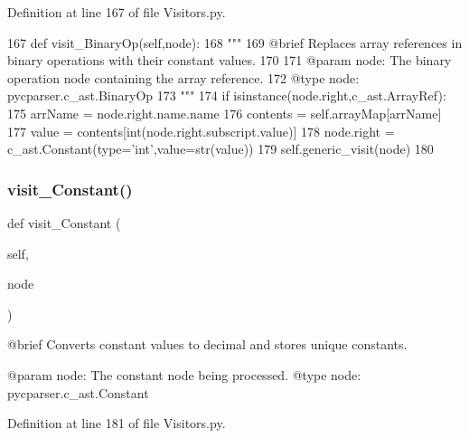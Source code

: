 Definition at line 167 of file Visitors.\+py.


\begin{DoxyCode}
167     \textcolor{keyword}{def }visit\_BinaryOp(self,node):
168         \textcolor{stringliteral}{"""
}
169 \textcolor{stringliteral}{        @brief Replaces array references in binary operations with their constant values.
}
170 \textcolor{stringliteral}{
}
171 \textcolor{stringliteral}{        @param node: The binary operation node containing the array reference.
}
172 \textcolor{stringliteral}{        @type node: pycparser.c\_ast.BinaryOp
}
173 \textcolor{stringliteral}{        """}
174         \textcolor{keywordflow}{if} isinstance(node.right,c\_ast.ArrayRef):
175             arrName = node.right.name.name
176             contents = self.arrayMap[arrName]
177             value = contents[int(node.right.subscript.value)]
178             node.right = c\_ast.Constant(type=\textcolor{stringliteral}{'int'},value=str(value))
179         self.generic\_visit(node)
180     
\end{DoxyCode}
\mbox{\label{classVisitors_1_1ArrayValueReplacer_af527c76a7bf39f449d92deb30bf74144}} 
\subsubsection{\texorpdfstring{visit\+\_\+\+Constant()}{visit\_Constant()}}
{\footnotesize\ttfamily def visit\+\_\+\+Constant (\begin{DoxyParamCaption}\item[{}]{self,  }\item[{}]{node }\end{DoxyParamCaption})}

\begin{DoxyVerb}@brief Converts constant values to decimal and stores unique constants.

@param node: The constant node being processed.
@type node: pycparser.c_ast.Constant
\end{DoxyVerb}
 

Definition at line 181 of file Visitors.\+py.


